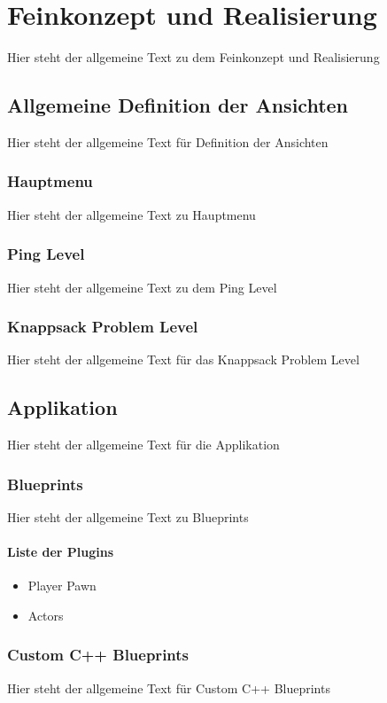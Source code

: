 \chapter{Feinkonzept und Realisierung}
Hier steht der allgemeine Text zu dem Feinkonzept und Realisierung

\section{Allgemeine Definition der Ansichten}
Hier steht der allgemeine Text für Definition der Ansichten

\subsection{Hauptmenu}
Hier steht der allgemeine Text zu Hauptmenu

\subsection{Ping Level}
Hier steht der allgemeine Text zu dem Ping Level

\subsection{Knappsack Problem Level}
Hier steht der allgemeine Text für das Knappsack Problem Level

\section{Applikation}
Hier steht der allgemeine Text für die Applikation

\subsection{Blueprints}
Hier steht der allgemeine Text zu Blueprints
\subsubsection{Liste der Plugins}
\begin{itemize}
    \item Player Pawn
    \item Actors
\end{itemize}

\subsection{Custom C++ Blueprints}
Hier steht der allgemeine Text für Custom C++ Blueprints

